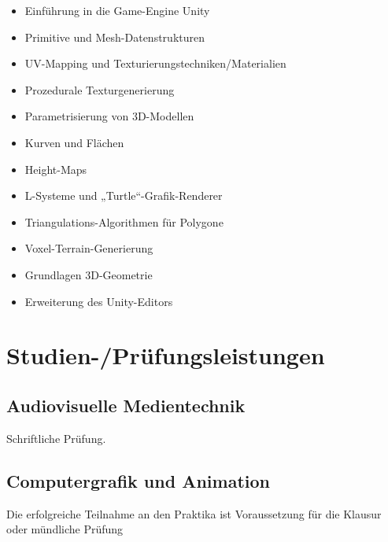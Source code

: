 \begin{itemize}
\tightlist
\item
  Einführung in die Game-Engine Unity
\item
  Primitive und Mesh-Datenstrukturen
\item
  UV-Mapping und Texturierungstechniken/Materialien
\item
  Prozedurale Texturgenerierung
\item
  Parametrisierung von 3D-Modellen
\item
  Kurven und Flächen
\item
  Height-Maps
\item
  L-Systeme und „Turtle``-Grafik-Renderer
\item
  Triangulations-Algorithmen für Polygone
\item
  Voxel-Terrain-Generierung
\item
  Grundlagen 3D-Geometrie
\item
  Erweiterung des Unity-Editors
\end{itemize}

\section*{Studien-/Prüfungsleistungen\label{/mi-2017/modulbeschreibungen-bachelor/BA_Vertiefung-Visual-Computing}}\label{studien-pruxfcfungsleistungenpathlabelmi-2017modulbeschreibungen-bachelorbaux5fvertiefung-visual-computing}

\subsection*{Audiovisuelle
Medientechnik\label{/mi-2017/modulbeschreibungen-bachelor/BA_Vertiefung-Visual-Computing}}\label{audiovisuelle-medientechnikpathlabelmi-2017modulbeschreibungen-bachelorbaux5fvertiefung-visual-computing-3}

Schriftliche Prüfung.

\subsection*{Computergrafik und
Animation\label{/mi-2017/modulbeschreibungen-bachelor/BA_Vertiefung-Visual-Computing}}\label{computergrafik-und-animationpathlabelmi-2017modulbeschreibungen-bachelorbaux5fvertiefung-visual-computing-3}

Die erfolgreiche Teilnahme an den Praktika ist Voraussetzung für die
Klausur oder mündliche Prüfung

